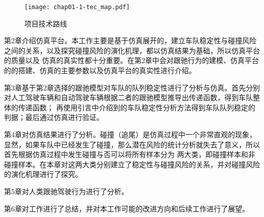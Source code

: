 \begin{figure}
  \centering
  \texttt{[image: chap01-1-tec\_map.pdf]}
  \caption{项目技术路线}
  \label{fig:chap01-1}
\end{figure}

第2章介绍仿真平台。本工作主要是基于仿真展开的，建立车队稳定性与碰撞风险之间的关系，以及探究碰撞风险的演化机理，都以仿真结果为基础，所以仿真平台的质量以及
仿真的真实性都十分重要。在第2章中会对跟驰行为的建模、仿真平台的的搭建、仿真的主要参数以及仿真平台的真实性进行介绍。

第3章基于第2章选择的跟驰模型对车队的队列稳定性进行了分析与仿真。首先分别对人工驾驶车辆和自动驾驶车辆根据二者的跟驰模型推导出传递函数，得到车队整体的传递函数；
再使用引言中介绍到的车队稳定性分析方法得到车队队列稳定的判据；最后通过仿真进行验证。

第4章对仿真结果进行了分析。碰撞（追尾）是仿真过程中一个非常直观的现象，显然，如果车队中已经发生了碰撞，那么潜在风险的统计分析就失去了意义，所以首先根据仿真过程中发生碰撞与否可以将所有样本分为
两大类，即碰撞样本和非碰撞样本。在本章对这两大类分别建立了稳定性与碰撞风险的关系，并对碰撞风险的演化机理进行了探究。

第5章对人类跟驰驾驶行为进行了分析。

第6章对工作进行了总结，并对本工作可能的改进方向和后续工作进行了展望。


